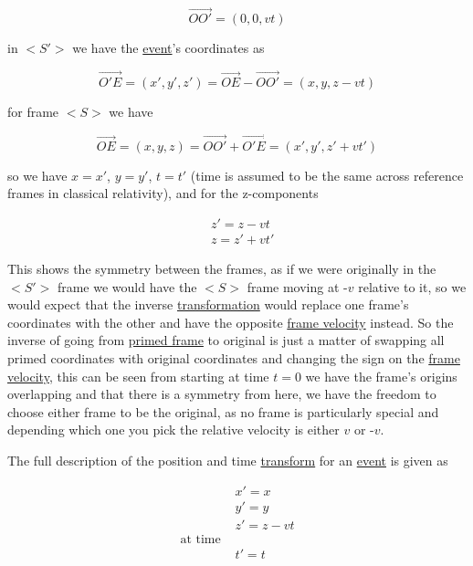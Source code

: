 \begin{equation}
	\vec{OO'}=(0,0,vt)
\end{equation}

in $<\!\!S'\!\!>$ we have the \hyperlink{def-event}{event}'s coordinates as

\begin{equation}
	\vec{O'E} = ( x{'}, y{'}, z{'} ) = \vec{OE} - \vec{OO'} = (x,y,z-vt)
	\label{eq: classical event}
\end{equation}

for frame $<\!\!S\!>$ we have

\begin{equation}
	\vec{OE} = (x,y,z) = \vec{OO'} + \vec{O'E} = (x{'},y',z'+vt')
	\label{eq: classical event 2}
\end{equation}

so we have $x=x'$, $y=y'$, $t=t'$ (time is assumed to be the same across reference frames in classical relativity), and for the z-components

\begin{equation}
	\begin{aligned}
		 & z' = z - vt \\
		 & z = z'+vt'
	\end{aligned}
\end{equation}

This shows the symmetry between the frames, as if we were originally in the $<\!\!S'\!\!>$ frame we would have the $<\!\!S\!>$ frame moving at -$v$ relative to it, so we would expect that the inverse \hyperlink{def-transform}{transformation} would replace one frame's coordinates with the other and have the opposite \hyperlink{def-frame-velocity}{frame velocity} instead.
So the inverse of going from \hyperlink{def-Primed-Frame}{primed frame} to original is just a matter of swapping all primed coordinates with original coordinates and changing the sign on the \hyperlink{def-frame-velocity}{frame velocity}, this can be seen from starting at time $t=0$ we have the frame's origins overlapping and that there is a symmetry from here, we have the freedom to choose either frame to be the original, as no frame is particularly special and depending which one you pick the relative velocity is either $v$ or -$v$.

The full description of the position and time \hyperlink{def-transform}{transform} for an \hyperlink{def-event}{event} is given as

\begin{equation}
	\begin{aligned}
		 & x'=x               \\
		 & y'=y               \\
		 & z' = z-vt          \\
		\text{at time \ \ \ } \\
		 & t'= t
	\end{aligned}
	\label{eq: Galilean transformation}
\end{equation}


